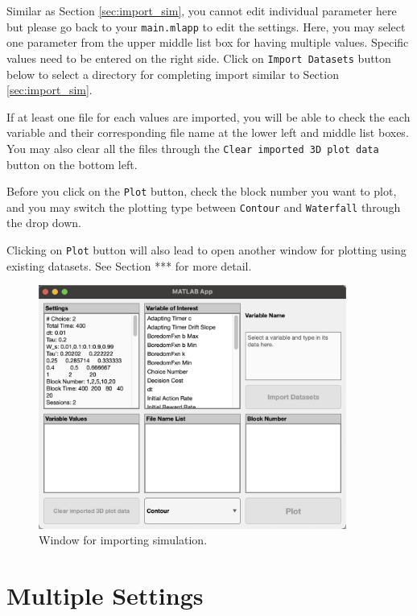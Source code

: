 Similar as Section \ref{sec:import_sim}, you cannot edit individual parameter here but please go back to your \texttt{main.mlapp} to edit the settings. Here, you may select one parameter from the upper middle list box for having multiple values. Specific values need to be entered on the right side. Click on \texttt{Import Datasets} button below to select a directory for completing import similar to Section \ref{sec:import_sim}.

If at least one file for each values are imported, you will be able to check the each variable and their corresponding file name at the lower left and middle list boxes. You may also clear all the files through the \texttt{Clear imported 3D plot data} button on the bottom left.

Before you click on the \texttt{Plot} button, check the block number you want to plot, and you may switch the plotting type between \texttt{Contour} and \texttt{Waterfall} through the drop down.

Clicking on \texttt{Plot} button will also lead to open another window for plotting using existing datasets. See Section *** for more detail.

\begin{figure}[H]
    \centering
    \includegraphics[width=0.9\textwidth]{figs/import_batch.png}
    \caption{Window for importing simulation.}
    \label{fig:import_batch}
\end{figure}

\section{Multiple Settings}

